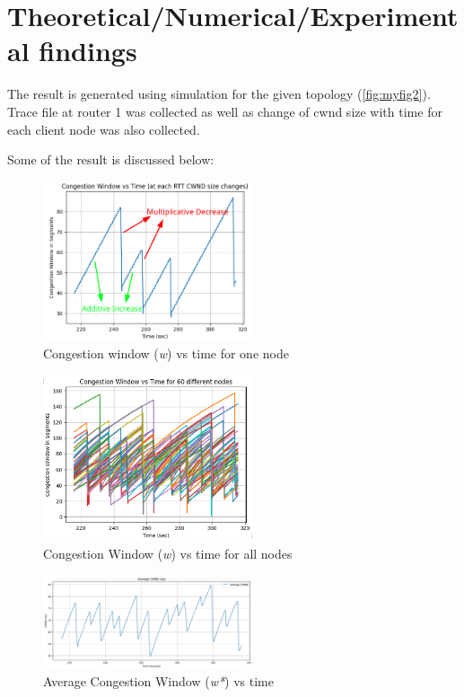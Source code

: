 \clearpage
\section{Theoretical/Numerical/Experimental findings}
The result is generated using simulation for the given topology (\ref{fig:myfig2}). Trace file at router 1 was collected as well as change of cwnd size with time for each client node was also collected. 

Some of the result is discussed below:\\
\begin{figure}[h]
    \centering
    \includegraphics[width=0.55\textwidth]{./images/aimd.png}
    \caption{\label{fig:myfig3} Congestion window (\textit{w}) vs time for one node}
\end{figure}
\begin{figure}[h]
    \centering
    \includegraphics[width=0.55\textwidth]{./images/allNodesCwnd.png}
    \caption{\label{fig:myfig4} Congestion Window (\textit{w}) vs time for all nodes}
\end{figure}
\begin{figure}[h]
    \centering
    \includegraphics[width=0.55\textwidth]{./images/avgCwnd.png}
    \caption{\label{fig:myfig5} Average Congestion Window (\textit{w*}) vs time }
\end{figure}
